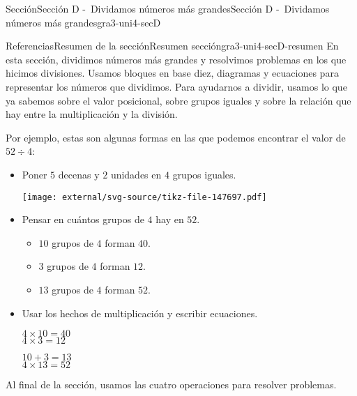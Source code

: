 \documentclass[twoside,10pt,]{article}
\begin{document}
\begin{sectionptx}{Sección}{Sección D -~Dividamos números más grandes}{}{Sección D -~Dividamos números más grandes}{}{}{gra3-uni4-secD}
\begin{references-subsection}{Referencias}{Resumen de la sección}{}{Resumen sección}{}{}{gra3-uni4-secD-resumen}
En esta sección, dividimos números más grandes y resolvimos problemas en los que hicimos divisiones. Usamos bloques en base diez, diagramas y ecuaciones para representar los números que dividimos. Para ayudarnos a dividir, usamos lo que ya sabemos sobre el valor posicional, sobre grupos iguales y sobre la relación que hay entre la multiplicación y la división.%
\par
Por ejemplo, estas son algunas formas en las que podemos encontrar el valor de \(52 \div 4\):%
%
\begin{itemize}[label=\textbullet]
\item{}Poner \(5\) decenas y \(2\) unidades en \(4\) grupos iguales.%
\begin{image}{0}{1}{0}{}%
\texttt{[image: external/svg-source/tikz-file-147697.pdf]}
\end{image}%
\item{}Pensar en cuántos grupos de \(4\) hay en \(52\).%
%
\begin{itemize}[label=$\circ$]
\item{}\(10\) grupos de \(4\) forman \(40\).%
\item{}\(3\) grupos de \(4\) forman \(12\).%
\item{}\(13\) grupos de \(4\) forman \(52\).%
\end{itemize}
\item{}Usar los hechos de multiplicación y escribir ecuaciones.%
\begin{sidebyside}{2}{0}{0.2}{0}%
\begin{sbspanel}{0.4}%
\(4 \times 10 = 40\)\\
 \(4 \times 3 = 12\)%
\end{sbspanel}%
\begin{sbspanel}{0.4}%
\par
\(10 + 3 = 13\)\\
 \(4 \times 13 = 52\)%
\end{sbspanel}%
\end{sidebyside}%
\end{itemize}
Al final de la sección, usamos las cuatro operaciones para resolver problemas.%
\end{references-subsection}
\end{sectionptx}
%
%
\typeout{************************************************}
\typeout{************************************************}
%
\end{document}
